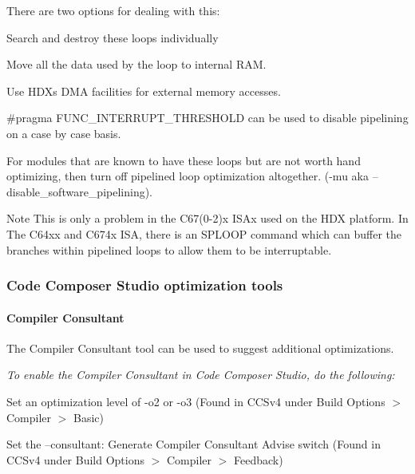 There are two options for dealing with this\+: 
\begin{DoxyEnumerate}
\item Search and destroy these loops individually 
\begin{DoxyItemize}
\item Move all the data used by the loop to internal R\+A\+M.  
\item Use H\+D\+X\textquotesingle{}s D\+M\+A facilities for external memory accesses.  
\item {\ttfamily \#pragma F\+U\+N\+C\+\_\+\+I\+N\+T\+E\+R\+R\+U\+P\+T\+\_\+\+T\+H\+R\+E\+S\+H\+O\+L\+D} can be used to disable pipelining on a case by case basis.  
\end{DoxyItemize}
\item For modules that are known to have these loops but are not worth hand optimizing, then turn off pipelined loop optimization altogether. ({\ttfamily -\/mu aka –disable\+\_\+software\+\_\+pipelining}).  
\end{DoxyEnumerate}

\begin{DoxyNote}{Note}
This is only a problem in the C67(0-\/2)x I\+S\+Ax used on the H\+D\+X platform. In The C64xx and C674x I\+S\+A, there is an S\+P\+L\+O\+O\+P command which can buffer the branches within pipelined loops to allow them to be interruptable.
\end{DoxyNote}
\hypertarget{a00362_subsection__code_composer_studio_optimization_tools}{}\subsubsection{Code Composer Studio optimization tools}\label{a00362_subsection__code_composer_studio_optimization_tools}
 \hypertarget{a00362_subsubsection__compiler_consultant_}{}\paragraph{Compiler Consultant}\label{a00362_subsubsection__compiler_consultant_}
 The Compiler Consultant tool can be used to suggest additional optimizations.

{\itshape  To enable the Compiler Consultant in Code Composer Studio, do the following\+:} 
\begin{DoxyEnumerate}
\item Set an optimization level of {\ttfamily -\/o2} or {\ttfamily -\/o3} (Found in C\+C\+Sv4 under Build Options $>$ Compiler $>$ Basic)  
\item Set the –consultant\+: {\ttfamily Generate Compiler Consultant Advise} switch (Found in C\+C\+Sv4 under Build Options $>$ Compiler $>$ Feedback)  
\end{DoxyEnumerate}

